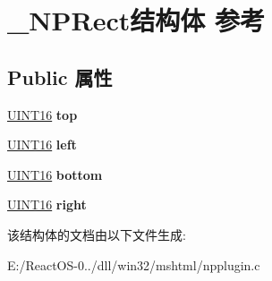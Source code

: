 \hypertarget{struct___n_p_rect}{}\section{\+\_\+\+N\+P\+Rect结构体 参考}
\label{struct___n_p_rect}
\subsection*{Public 属性}
\begin{DoxyCompactItemize}
\item 
\mbox{\label{struct___n_p_rect_a295eb9fae83516661add4c6d0e912cd0}} 
\hyperlink{_processor_bind_8h_a09f1a1fb2293e33483cc8d44aefb1eb1}{U\+I\+N\+T16} {\bfseries top}
\item 
\mbox{\label{struct___n_p_rect_a418ecf0602ec0a0e9962dce63350942e}} 
\hyperlink{_processor_bind_8h_a09f1a1fb2293e33483cc8d44aefb1eb1}{U\+I\+N\+T16} {\bfseries left}
\item 
\mbox{\label{struct___n_p_rect_a835bed2c9eacf3ce708e9b59609802a2}} 
\hyperlink{_processor_bind_8h_a09f1a1fb2293e33483cc8d44aefb1eb1}{U\+I\+N\+T16} {\bfseries bottom}
\item 
\mbox{\label{struct___n_p_rect_ade92f21271119e0361b434621c20de54}} 
\hyperlink{_processor_bind_8h_a09f1a1fb2293e33483cc8d44aefb1eb1}{U\+I\+N\+T16} {\bfseries right}
\end{DoxyCompactItemize}


该结构体的文档由以下文件生成\+:\begin{DoxyCompactItemize}
\item 
E\+:/\+React\+O\+S-\/0../dll/win32/mshtml/npplugin.\+c\end{DoxyCompactItemize}
